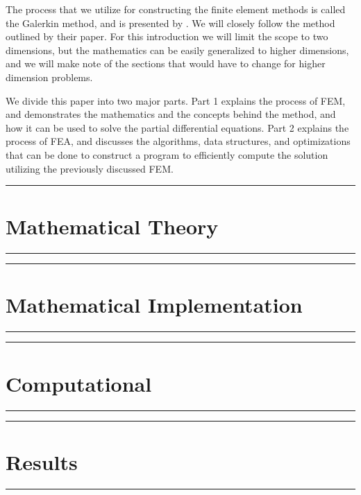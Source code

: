 \documentclass[10pt]{armath}
\numberwithin{equation}{section}
\theoremstyle{definition}
\newcommand{\hdiv}[3]{
  \vspace{#1}%
  \noindent\rule{\textwidth}{#2}%
  \vspace{#3}%
}
\begin{document}
The process that we utilize for constructing the finite element methods is
called the Galerkin method, and is presented by \cite{KH}. We will closely
follow the method outlined by their paper. For this introduction we will limit
the scope to two dimensions, but the mathematics can be easily generalized to
higher dimensions, and we will make note of the sections that would have to
change for higher dimension problems.

We divide this paper into two major parts. Part 1 explains the process of FEM,
and demonstrates the mathematics and the concepts behind the method, and how it
can be used to solve the partial differential equations. Part 2 explains the
process of FEA, and discusses the algorithms, data structures, and
optimizations that can be done to construct a program to efficiently compute
the solution utilizing the previously discussed FEM.

\newpage
\hdiv{10pt}{0.5pt}{1pt}
\part{Mathematical Theory}%
\label{prt:mathematical_theory}
\hdiv{1pt}{0.5pt}{10pt}







\newpage
\hdiv{10pt}{0.5pt}{1pt}
\part{Mathematical Implementation}%
\label{prt:mathematical_implementation}
\hdiv{1pt}{0.5pt}{10pt}








\newpage
\hdiv{10pt}{0.5pt}{1pt}
\part{Computational}%
\label{prt:computational}
\hdiv{1pt}{0.5pt}{10pt}








\newpage
\hdiv{10pt}{0.5pt}{1pt}
\part{Results}%
\label{prt:results}
\hdiv{1pt}{0.5pt}{10pt}
\end{document}

